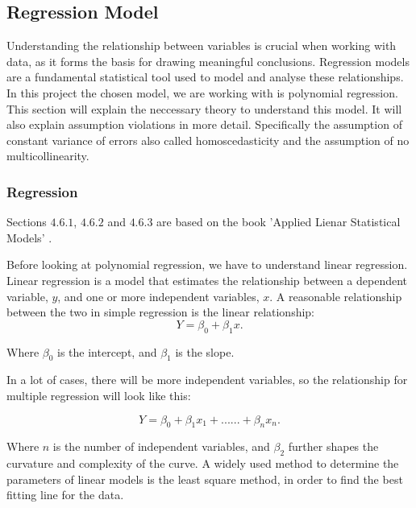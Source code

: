 \subsection{Regression Model}
Understanding the relationship between variables is crucial when working with data, as it forms the basis for drawing meaningful conclusions. Regression models are a fundamental statistical tool used to model and analyse these relationships. In this project the chosen model, we are working with is polynomial regression. This section will explain the neccessary theory to understand this model. It will also explain assumption violations in more detail. Specifically the assumption of constant variance of errors also called homoscedasticity and the assumption of no multicollinearity.

\subsubsection{Regression}
Sections $4.6.1$, $4.6.2$ and $4.6.3$ are based on the book 'Applied Lienar Statistical Models' \cite{AppliedLSM}. 
\newline 

\noindent Before looking at polynomial regression, we have to understand linear regression. \newline 
Linear regression is a model that estimates the relationship between a dependent variable, \( y \), and one or more independent variables, \( x \). A reasonable relationship between the two in simple regression is the linear relationship:
\begin{equation}
Y = \beta_0 + \beta_1 x .
\end{equation}


\noindent Where \( \beta_0 \) is the intercept, and \( \beta_1 \) is the slope.

\noindent In a lot of cases, there will be more independent variables, so the relationship for multiple regression will look like this:

\begin{equation}
	Y = \beta_0 + \beta_1 x_1 + ......+ \beta_n x_n .
\end{equation}




\noindent Where \( n \) is the number of independent variables, and $\beta_2$ further shapes the curvature and complexity of the curve. A widely used method to determine the parameters of linear models is the least square method, in order to find the best fitting line for the data.

